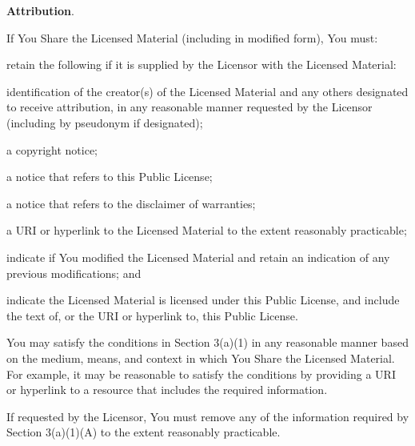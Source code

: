 \begin{doclicense@enumerate}
\item \par \textbf{Attribution}.
\begin{doclicense@enumerate}
\item \par If You Share the Licensed Material (including in modified form), You must:
\begin{doclicense@enumerate}
\item retain the following if it is supplied by the Licensor with the Licensed Material:
\begin{doclicense@enumerate}
\item identification of the creator(s) of the Licensed Material and any others designated to receive attribution, in any reasonable manner requested by the Licensor (including by pseudonym if designated);
\item a copyright notice;
\item a notice that refers to this Public License; 
\item a notice that refers to the disclaimer of warranties;
\item a URI or hyperlink to the Licensed Material to the extent reasonably practicable;
\end{doclicense@enumerate}
\item indicate if You modified the Licensed Material and retain an indication of any previous modifications; and
\item indicate the Licensed Material is licensed under this Public License,
and include the text of, or the URI or hyperlink to, this Public
License.
\end{doclicense@enumerate}

\item You may satisfy the conditions in Section 3(a)(1) in any reasonable manner based on the medium, means, and context in which You Share the Licensed Material. For example, it may be reasonable to satisfy the conditions by providing a URI or hyperlink to a resource that includes the required information.
\item If requested by the Licensor, You must remove any of the information required by Section 3(a)(1)(A) to the extent reasonably practicable.
\end{doclicense@enumerate}


\end{doclicense@enumerate}
